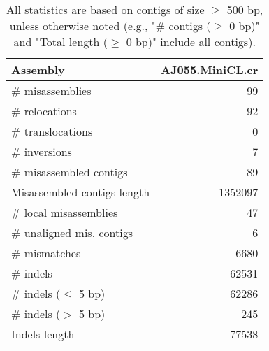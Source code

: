 \documentclass[12pt,a4paper]{article}
\begin{document}
\begin{table}[ht]
\begin{center}
\caption{All statistics are based on contigs of size $\geq$ 500 bp, unless otherwise noted (e.g., "\# contigs ($\geq$ 0 bp)" and "Total length ($\geq$ 0 bp)" include all contigs).}
\begin{tabular}{|l*{1}{|r}|}
\hline
Assembly & AJ055.MiniCL.cr \\ \hline
\# misassemblies & 99 \\ \hline
\hspace{5mm}\# relocations & 92 \\ \hline
\hspace{5mm}\# translocations & 0 \\ \hline
\hspace{5mm}\# inversions & 7 \\ \hline
\# misassembled contigs & 89 \\ \hline
Misassembled contigs length & 1352097 \\ \hline
\# local misassemblies & 47 \\ \hline
\# unaligned mis. contigs & 6 \\ \hline
\# mismatches & 6680 \\ \hline
\# indels & 62531 \\ \hline
\hspace{5mm}\# indels ($\leq$ 5 bp) & 62286 \\ \hline
\hspace{5mm}\# indels ($>$ 5 bp) & 245 \\ \hline
Indels length & 77538 \\ \hline
\end{tabular}
\end{center}
\end{table}
\end{document}
